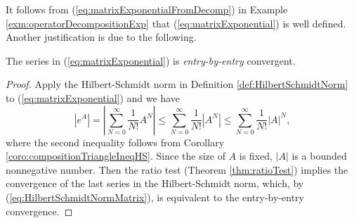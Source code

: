 \begin{rem}
  It follows from (\ref{eq:matrixExponentialFromDecomp})
  in Example \ref{exm:operatorDecompositionExp} that
  (\ref{eq:matrixExponential}) is well defined.
  Another justification is due to the following. 
\end{rem}

\begin{lem}
  \label{lem:expMatConverges}
  The series in (\ref{eq:matrixExponential}) is 
  \emph{entry-by-entry} convergent.
\end{lem}
\begin{proof}
  Apply the Hilbert-Schmidt norm
  in Definition \ref{def:HilbertSchmidtNorm}
  to (\ref{eq:matrixExponential})
  and we have
  \begin{displaymath}
    \left|e^{A}\right|
    = \left|\sum_{N=0}^{\infty}\frac{1}{N!}A^N\right|
    \le \sum_{N=0}^{\infty}\frac{1}{N!}\left|A^N\right|
    \le \sum_{N=0}^{\infty}\frac{1}{N!}\left|A\right|^N,
  \end{displaymath}
  where the second inequality follows from Corollary
  \ref{coro:compositionTriangleIneqHS}. 
  Since the size of $A$ is fixed,
  $|A|$ is a bounded nonnegative number.
  Then the ratio test (Theorem \ref{thm:ratioTest}) implies
   the convergence of the last series in the Hilbert-Schmidt norm,
   which,
   by (\ref{eq:HilbertSchmidtNormMatrix}), %
   is equivalent to
   the entry-by-entry convergence.
\end{proof}

